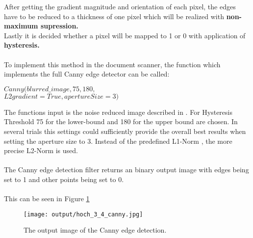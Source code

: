 \documentclass[twocolumn,10pt]{asme2ej}
\begin{document}
\noindent
After getting the gradient magnitude and orientation of each pixel, the edges have
to be reduced to a thickness of one pixel which will be realized with \textbf{non-maximum supression.}
\\
Lastly it is decided whether a pixel will be mapped to 1 or 0 with application of \textbf{hysteresis.}\\\\
\noindent
To implement this method in the document scanner, the function
which implements the full Canny edge detector\cite{opencv_canny} can be called:
\begin{center}
    \noindent
    $Canny(blurred\_image,75, 180,$\\
    $L2gradient = True, apertureSize = 3)$
\end{center}
\noindent
The functions input is the noise reduced image described in .
For Hysteresis Threshold 75 for the lower-bound and 180 for the upper bound are chosen.
In several trials this settings could sufficiently provide the overall best results 
when setting the aperture size to 3.
Instead of the predefined L1-Norm \cite{l1_norm}, the more precise L2-Norm\cite{l2_norm} is used.
\\\\
The Canny edge detection filter returns an binary output image with edges
being set to 1 and other points being set to 0.
\\\\
This can be seen in Figure \ref{fig:canny}

\begin{figure}[H]
\centerline{\texttt{[image: output/hoch\_3\_4\_canny.jpg]}}
\caption{The output image of the Canny edge detection.}
\label{fig:canny}
\end{figure}

\end{document}

